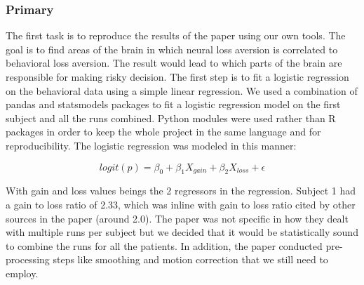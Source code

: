 \documentclass[11pt]{article}
\begin{document}
\subsubsection{Primary}

The first task is to reproduce the results of the paper using our own tools.
The goal is to find areas of the brain in which neural loss aversion is
correlated to behavioral loss aversion. The result would lead to which parts of
the brain are responsible for making risky decision. The first step is to fit a
logistic regression on the behavioral data using a simple linear regression. We
used a combination of pandas and statsmodels packages to fit a logistic
regression model on the first subject and all the runs combined. Python modules
were used rather than R packages in order to keep the whole project in the same
language and for reproducibility. The logistic regression was modeled in this
manner:

\[ logit(p) = \beta_0 + \beta_1 X_{gain} + \beta_2 X_{loss} + \epsilon \] 

With gain and loss values beings the 2 regressors in the regression. Subject 1
had a gain to loss ratio of 2.33, which was inline with gain to loss ratio
cited by other sources in the paper (around 2.0). The paper was not specific in
how they dealt with multiple runs per subject but we decided that it would be
statistically sound to combine the runs for all the patients. In addition, the
paper conducted pre-processing steps like smoothing and motion correction that
we still need to employ. 
\end{document}

